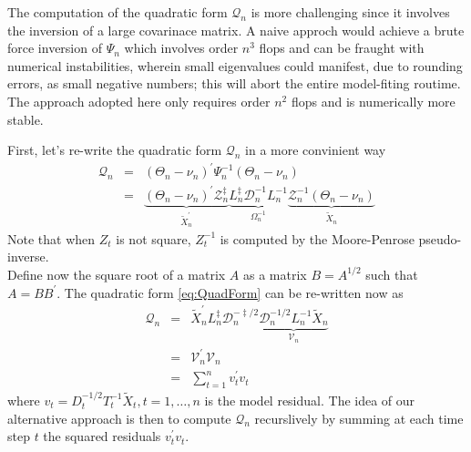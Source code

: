 \documentclass{article}
\begin{document}
The computation of the quadratic form $\mathcal{Q}_n$ is more challenging since it involves
the inversion of a large covarinace matrix. A naive approch would achieve a brute force
inversion of $\varPsi_n$ which involves order $n^3$ flops and can be fraught with numerical
instabilities, wherein small eigenvalues could manifest, due to rounding errors, as small
negative numbers; this will abort the entire model-fiting routime. The approach adopted here
only requires order $n^2$ flops and is numerically more stable.

First, let's re-write the quadratic form $\mathcal{Q}_n$ in a more convinient way
\begin{equation}
  \begin{array}{rcl}
    \mathcal{Q}_n & = & (\varTheta_n - \nu_n)^\prime \varPsi_n^{-1} (\varTheta_n - \nu_n) \\
                  & = & \underbrace{(\varTheta_n - \nu_n)^\prime
                  \mathcal{\mathcal{Z}}_n^{\ddag}}_{\tilde{X}_n^\prime}
                \underbrace{L_n^{\ddag} \mathcal{D}_n^{-1} L_n^{-1}}_{\Omega_n^{-1}}
                \underbrace{\mathcal{Z}_n^{-1} (\varTheta_n - \nu_n)}_{\tilde{X}_n}
  \end{array}
  \label{eq:QuadForm}
\end{equation}
Note that when $Z_t$ is not square, $Z_t^{-1}$ is computed by the Moore-Penrose pseudo-inverse. \\
Define now the square root of a matrix $A$ as a matrix $B= A^{1/2}$ such that
$A=BB^\prime$. The quadratic form \eqref{eq:QuadForm} can be re-written now as
\begin{equation}
  \begin{array}{rcl}
    \mathcal{Q}_n & = & \tilde{X}_n^\prime L_n^{\ddag} \mathcal{D}_n^{-\ddag /2}
    \underbrace{\mathcal{D}_n^{-1 /2} L_n^{-1}\tilde{X}_n}_{\mathcal{V}_n} \\
                  & = & \mathcal{V}_n^\prime \mathcal{V}_n \\
                  & = & \displaystyle \sum_{t=1}^n v_t^\prime v_t
  \end{array}
  \label{eq:QuadForm2Term}
\end{equation}
where $v_t = D_{t}^{-1/2}T_t^{-1}\tilde{X}_t, t=1,\dots,n$ is the model residual. The idea of
our alternative approach is then to compute $\mathcal{Q}_n$ recurslively by summing at each
time step $t$ the squared residuals $v_t^\prime v_t$.
\end{document}
